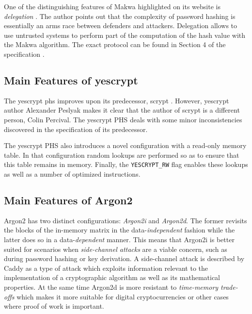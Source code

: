 One of the distinguishing features of Makwa highlighted on its website is \emph{delegation} \cite{makwa:2017:homepage}. The author points out that the complexity of password hashing is essentially an arms race between defenders and attackers. Delegation allows to use untrusted systems to perform part of the computation of the hash value with the Makwa algorithm. The exact protocol can be found in Section 4 of the specification \cite{pornin:2015:makwa}.

\subsection{Main Features of yescrypt}
\label{sec:yescrypt}

The yescrypt \gls{phs} \cite{peslyak:2015:yescrypt} improves upon its predecessor, scrypt \cite{percival:2016:scrypt}. However, yescrypt author Alexander Peslyak makes it clear that the author of scrypt is a different person, Colin Percival. The yescrypt PHS deals with some minor inconsistencies discovered in the specification of its predecessor.

The yescrypt PHS also introduces a novel configuration with a read-only memory table. In that configuration random lookups are performed so as to ensure that this table remains in memory. Finally, the \texttt{YESCRYPT\_RW} flag enables these lookups as well as a number of optimized instructions.

\subsection{Main Features of Argon2}
\label{sec:argon2}

Argon2 \cite{biryukov:2015:argon2} has two distinct configurations: \emph{Argon2i} and \emph{Argon2d}. The former revisits the blocks of the in-memory matrix in the data-\emph{independent} fashion while the latter does so in a data-\emph{dependent} manner. This means that Argon2i is better suited for scenarios when \emph{side-channel attacks} are a viable concern, such as during password hashing or key derivation. A side-channel attack is described by Caddy \cite{caddy:2005:side-channel} as a type of attack which exploits information relevant to the implementation of a cryptographic algorithm as well as its mathematical properties. At the same time Argon2d is more resistant to \emph{time-memory trade-offs} which makes it more suitable for digital cryptocurrencies or other cases where proof of work is important.


